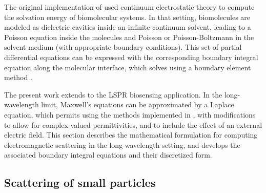 The original implementation of \pygbe used continuum electrostatic theory to compute
the solvation energy of biomolecular systems. In that setting, biomolecules are modeled as 
dielectric cavities inside an infinite continuum solvent, 
leading to a Poisson equation inside the molecules and Poisson or Poisson-Boltzmann in the solvent medium (with appropriate boundary conditions).
This set of partial differential equations can be 
expressed with the corresponding boundary integral equation along the molecular interface, 
which \pygbe solves using a boundary element method \cite{CooperBardhanBarba2013,CooperClementiBarba2015}.

The present work extends \pygbe to the LSPR biosensing application. 
In the long-wavelength limit, Maxwell's equations can be approximated by a Laplace equation,
which permits using the methods implemented in \pygbe, with modifications
to allow for complex-valued permittivities, and to include the
effect of an external electric field.
This section describes the mathematical formulation for computing electromagnetic scattering 
in the long-wavelength setting, and develops the associated boundary integral equations 
and their discretized form.

\subsection{Scattering of small particles} \label{sec:scattering_small}

